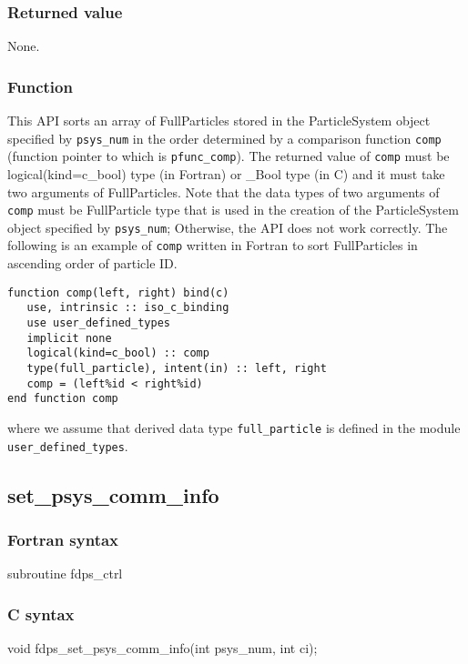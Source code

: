 \subsubsection*{Returned value}
None.

\subsubsection*{Function}
This API sorts an array of FullParticles stored in the ParticleSystem object specified by \texttt{psys\_num} in the order determined by a comparison function \texttt{comp} (function pointer to which is \texttt{pfunc\_comp}). The returned value of \texttt{comp} must be logical(kind=c\_bool) type {\small (in Fortran)} or \_Bool type {\small (in C)} and it must take two arguments of FullParticles. Note that the data types of two arguments of \texttt{comp} must be FullParticle type that is used in the creation of the ParticleSystem object specified by \texttt{psys\_num}; Otherwise, the API does not work correctly. The following is an example of \texttt{comp} written in Fortran to sort FullParticles in ascending order of particle ID.
\begin{lstlisting}[caption=An example of comparison function (Fortran)]
function comp(left, right) bind(c)
   use, intrinsic :: iso_c_binding
   use user_defined_types
   implicit none
   logical(kind=c_bool) :: comp
   type(full_particle), intent(in) :: left, right
   comp = (left%id < right%id)
end function comp
\end{lstlisting}
where we assume that derived data type \texttt{full\_particle} is defined in the module \texttt{user\_defined\_types}.


\subsection{set\_psys\_comm\_info}
\subsubsection*{Fortran syntax}
\begin{screen}
\begin{spverbatim}
subroutine fdps_ctrl%
\end{spverbatim}
\end{screen}

\subsubsection*{C syntax}
\begin{screen}
\begin{spverbatim}
void fdps_set_psys_comm_info(int psys_num,
                                   int ci);
\end{spverbatim}
\end{screen}



